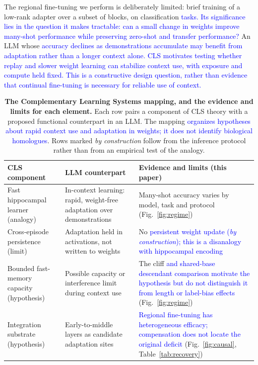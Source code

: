 \documentclass[pdflatex, sn-nature]{sn-jnl}%
\theoremstyle{thmstyleone}%
\theoremstyle{thmstyletwo}%
\theoremstyle{thmstylethree}%
\begin{document}
The regional fine-tuning we perform is deliberately limited: brief training of a
low-rank adapter over a subset of blocks, on classification \textcolor{blue}{tasks. Its significance
lies in the question it makes tractable: can a small change in weights improve
many-shot performance while preserving zero-shot and transfer performance?} An LLM whose
\textcolor{blue}{accuracy declines as demonstrations accumulate may benefit from adaptation rather than
a longer context alone. CLS motivates testing whether replay and slower weight learning
can stabilize context use, with exposure and compute held fixed. This is a constructive
design question, rather than evidence that continual fine-tuning is necessary for
reliable use of context.}

\begin{table}[t]
\centering
\caption{\textbf{The Complementary Learning Systems mapping, and the evidence and limits for each element.} Each row pairs a component of CLS theory with a proposed functional counterpart in an LLM. The mapping \textcolor{blue}{organizes hypotheses about rapid context use and adaptation in weights; it does not identify biological homologues}. Rows marked \emph{by construction} follow from the inference protocol rather than from an empirical test of the analogy.}
\label{tab:mapping}
\begin{tabular}{@{}p{}p{}p{}@{}}
\toprule
CLS component & LLM counterpart & Evidence and limits (this paper) \\
\midrule
Fast hippocampal learner (analogy) & In-context learning: rapid, weight-free adaptation over demonstrations & Many-shot accuracy varies by model, task and protocol (Fig.~\ref{fig:regime}) \\
Cross-episode persistence (limit) & Adaptation held in activations, not written to weights & No \textcolor{blue}{persistent weight update (}\emph{\textcolor{blue}{by construction}}\textcolor{blue}{); this is a disanalogy with hippocampal encoding} \\
Bounded fast-memory capacity (hypothesis) & Possible capacity or interference limit during context use & The cliff \textcolor{blue}{and shared-base descendant comparison motivate the hypothesis but do not distinguish it from length or label-bias effects} (Fig.~\ref{fig:regime}) \\
Integration substrate (hypothesis) & Early-to-middle layers as candidate adaptation sites & \textcolor{blue}{Regional fine-tuning has heterogeneous efficacy; compensation does not locate the original deficit} (Fig.~\ref{fig:causal}, Table~\ref{tab:recovery}) \\

\end{tabular}
\end{table}
\end{document}
